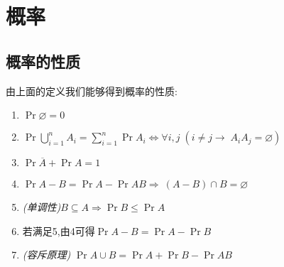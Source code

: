 \section{概率}
\subsection{概率的性质}
由上面的定义我们能够得到概率的性质:
\begin{enumerate}
    \item
          $\Pr{\varnothing}=0$
    \item
          $\Pr{\bigcup_{i=1}^{n} A_i}=\sum_{i=1}^n\Pr{A_i}\iff\forall i,j\;(i\neq j\to\; A_iA_j = \varnothing)$
    \item
          $\Pr{\overline A} + \Pr{A} = 1$
    \item
          $\Pr{A-B} = \Pr{A} - \Pr{AB}\Rightarrow\ (A-B) \cap B = \varnothing$
    \item
          \emph{(单调性)}$B\subseteq A \Rightarrow \Pr{B}\leq\Pr{A}$
    \item
          若满足5,由4可得$\Pr{A-B} = \Pr{A} - \Pr{B}$
    \item
          \emph{(容斥原理)}
          $\Pr{A\cup B}=\Pr{A} + \Pr{B} - \Pr{AB}$
\end{enumerate}
